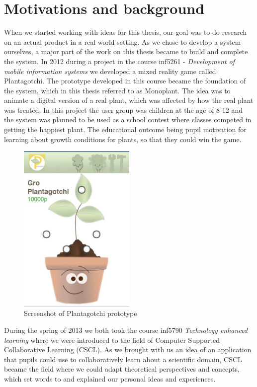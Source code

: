 \section{Motivations and background}
When we started working with ideas for this thesis, our goal was to do research on an actual product in a real world setting. As we chose to develop a system ourselves, a major part of the work on this thesis became to build and complete the system. In 2012 during a project in the course inf5261 - \emph{Development of mobile information systems} we developed a mixed reality game called Plantagotchi. The prototype developed in this course became the foundation of the system, which in this thesis referred to as Monoplant. The idea was to animate a digital version of a real plant, which was affected by how the real plant was treated. In this project the user group was children at the age of 8-12 and the system was planned to be used as a school contest where classes competed in getting the happiest plant. The educational outcome being pupil motivation for learning about growth conditions for plants, so that they could win the game. 

\begin{figure}
\centering
\includegraphics[width=0.5\textwidth]{img/introduction/plantagotchi.jpg}
\caption{Screenshot of Plantagotchi prototype}
\label{fig:scrshotplantagotchi}
\end{figure}

During the spring of 2013 we both took the course inf5790 \emph{Technology enhanced learning} where we were introduced to the field of Computer Supported Collaborative Learning (CSCL). As we brought with us an idea of an application that pupils could use to collaboratively learn about a scientific domain, CSCL became the field where we could adapt theoretical perspectives and concepts, which set words to and explained our personal ideas and experiences. 

